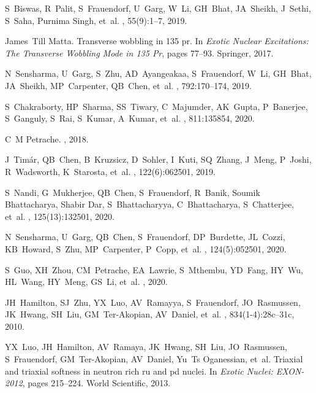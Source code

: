 \documentclass[myclassdoc,debug]{rjparticle}
\begin{document}
\begin{thebibliography}{99}
S~Biswas, R~Palit, S~Frauendorf, U~Garg, W~Li, GH~Bhat, JA~Sheikh, J~Sethi,
  S~Saha, Purnima Singh, et~al.
, 55(9):1--7, 2019.

James~Till Matta.
\newblock Transverse wobbling in 135 pr.
\newblock In {\em Exotic Nuclear Excitations: The Transverse Wobbling Mode in
  135 Pr}, pages 77--93. Springer, 2017.


N~Sensharma, U~Garg, S~Zhu, AD~Ayangeakaa, S~Frauendorf, W~Li, GH~Bhat,
  JA~Sheikh, MP~Carpenter, QB~Chen, et~al.
, 792:170--174, 2019.

S~Chakraborty, HP~Sharma, SS~Tiwary, C~Majumder, AK~Gupta, P~Banerjee,
  S~Ganguly, S~Rai, S~Kumar, A~Kumar, et~al.
, 811:135854, 2020.

C~M Petrache.
, 2018.

J~Tim{\'a}r, QB~Chen, B~Kruzsicz, D~Sohler, I~Kuti, SQ~Zhang, J~Meng, P~Joshi,
  R~Wadsworth, K~Starosta, et~al.
, 122(6):062501, 2019.

S~Nandi, G~Mukherjee, QB~Chen, S~Frauendorf, R~Banik, Soumik Bhattacharya,
  Shabir Dar, S~Bhattacharyya, C~Bhattacharya, S~Chatterjee, et~al.
, 125(13):132501, 2020.

N~Sensharma, U~Garg, QB~Chen, S~Frauendorf, DP~Burdette, JL~Cozzi, KB~Howard,
  S~Zhu, MP~Carpenter, P~Copp, et~al.
, 124(5):052501, 2020.

S~Guo, XH~Zhou, CM~Petrache, EA~Lawrie, S~Mthembu, YD~Fang, HY~Wu, HL~Wang,
  HY~Meng, GS~Li, et~al.
, 2020.

JH~Hamilton, SJ~Zhu, YX~Luo, AV~Ramayya, S~Frauendorf, JO~Rasmussen, JK~Hwang,
  SH~Liu, GM~Ter-Akopian, AV~Daniel, et~al.
, 834(1-4):28c--31c, 2010.

YX~Luo, JH~Hamilton, AV~Ramaya, JK~Hwang, SH~Liu, JO~Rasmussen, S~Frauendorf,
  GM~Ter-Akopian, AV~Daniel, Yu~Ts Oganessian, et~al.
\newblock Triaxial and triaxial softness in neutron rich ru and pd nuclei.
\newblock In {\em Exotic Nuclei: EXON-2012}, pages 215--224. World Scientific,
  2013.
  

\end{thebibliography}
\end{document}
